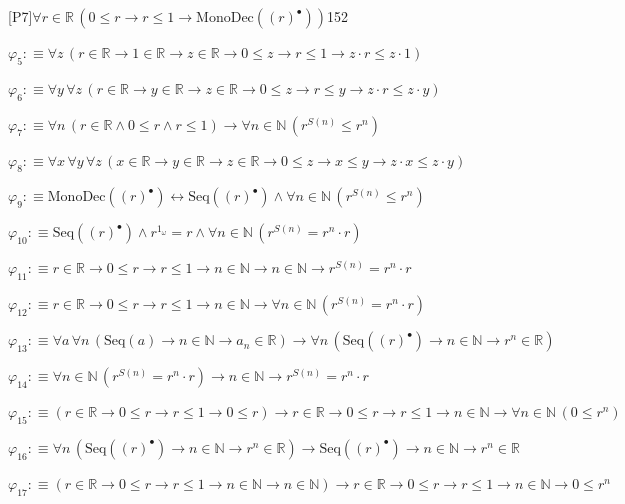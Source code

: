 \begin{fullproof}{[P7]}{$\forall r \in \mathbb{R}\,(0 \leq r \to r \leq 1 \to \mathrm{MonoDec}({(r)^{\bullet}}))$}{152}
\begin{abbrevlist}
\item $\varphi_{5} :\equiv \forall z\,(r \in \mathbb{R} \to 1 \in \mathbb{R} \to z \in \mathbb{R} \to 0 \leq z \to r \leq 1 \to z \cdot r \leq z \cdot 1)$
\item $\varphi_{6} :\equiv \forall y\,\forall z\,(r \in \mathbb{R} \to y \in \mathbb{R} \to z \in \mathbb{R} \to 0 \leq z \to r \leq y \to z \cdot r \leq z \cdot y)$
\item $\varphi_{7} :\equiv \forall n\,(r \in \mathbb{R} \land 0 \leq r \land r \leq 1) \to \forall n \in \mathbb{N}\,({{r}^{S(n)}} \leq {{r}^{n}})$
\item $\varphi_{8} :\equiv \forall x\,\forall y\,\forall z\,(x \in \mathbb{R} \to y \in \mathbb{R} \to z \in \mathbb{R} \to 0 \leq z \to x \leq y \to z \cdot x \leq z \cdot y)$
\item $\varphi_{9} :\equiv \mathrm{MonoDec}({(r)^{\bullet}}) \leftrightarrow \mathrm{Seq}({(r)^{\bullet}}) \land \forall n \in \mathbb{N}\,({{r}^{S(n)}} \leq {{r}^{n}})$
\item $\varphi_{10} :\equiv \mathrm{Seq}({(r)^{\bullet}}) \land {{r}^{1_{\omega}}} = r \land \forall n \in \mathbb{N}\,({{r}^{S(n)}} = {{r}^{n}} \cdot r)$
\item $\varphi_{11} :\equiv r \in \mathbb{R} \to 0 \leq r \to r \leq 1 \to n \in \mathbb{N} \to n \in \mathbb{N} \to {{r}^{S(n)}} = {{r}^{n}} \cdot r$
\item $\varphi_{12} :\equiv r \in \mathbb{R} \to 0 \leq r \to r \leq 1 \to n \in \mathbb{N} \to \forall n \in \mathbb{N}\,({{r}^{S(n)}} = {{r}^{n}} \cdot r)$
\item $\varphi_{13} :\equiv \forall a\,\forall n\,(\mathrm{Seq}(a) \to n \in \mathbb{N} \to a_{n} \in \mathbb{R}) \to \forall n\,(\mathrm{Seq}({(r)^{\bullet}}) \to n \in \mathbb{N} \to {{r}^{n}} \in \mathbb{R})$
\item $\varphi_{14} :\equiv \forall n \in \mathbb{N}\,({{r}^{S(n)}} = {{r}^{n}} \cdot r) \to n \in \mathbb{N} \to {{r}^{S(n)}} = {{r}^{n}} \cdot r$
\item $\varphi_{15} :\equiv (r \in \mathbb{R} \to 0 \leq r \to r \leq 1 \to 0 \leq r) \to r \in \mathbb{R} \to 0 \leq r \to r \leq 1 \to n \in \mathbb{N} \to \forall n \in \mathbb{N}\,(0 \leq {{r}^{n}})$
\item $\varphi_{16} :\equiv \forall n\,(\mathrm{Seq}({(r)^{\bullet}}) \to n \in \mathbb{N} \to {{r}^{n}} \in \mathbb{R}) \to \mathrm{Seq}({(r)^{\bullet}}) \to n \in \mathbb{N} \to {{r}^{n}} \in \mathbb{R}$
\item $\varphi_{17} :\equiv (r \in \mathbb{R} \to 0 \leq r \to r \leq 1 \to n \in \mathbb{N} \to n \in \mathbb{N}) \to r \in \mathbb{R} \to 0 \leq r \to r \leq 1 \to n \in \mathbb{N} \to 0 \leq {{r}^{n}}$

\end{abbrevlist}
\end{fullproof}

